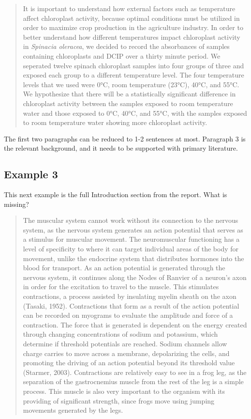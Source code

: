 \documentclass[
]{book}
\begin{document}
\begin{quote}
It is important to understand how external factors such as temperature affect chloroplast activity, because optimal conditions must be utilized in order to maximize crop production in the agriculture industry. In order to better understand how different temperatures impact chloroplast activity in \emph{Spinacia oleracea}, we decided to record the absorbances of samples containing chloroplasts and DCIP over a thirty minute period. We seperated twelve spinach chloroplast samples into four groups of three and exposed each group to a different temperature level. The four temperature levels that we used were 0°C, room temperature (23°C), 40°C, and 55°C. We hypothesize that there will be a statistically significant difference in chloroplast activity between the samples exposed to room temperature water and those exposed to 0°C, 40°C, and 55°C, with the samples exposed to room temperature water showing more chloroplast activity.
\end{quote}

The first two paragraphs can be reduced to 1-2 sentences at most. Paragraph 3 is the relevant background, and it needs to be supported with primary literature.

\hypertarget{example-3-2}{%
\subsection{Example 3}\label{example-3-2}}

This next example is the full Introduction section from the report. What is missing?

\begin{quote}
The muscular system cannot work without its connection to the nervous system, as the nervous system generates an action potential that serves as a stimulus for muscular movement. The neuromuscular functioning has a level of specificity to where it can target individual areas of the body for movement, unlike the endocrine system that distributes hormones into the blood for transport. As an action potential is generated through the nervous system, it continues along the Nodes of Ranvier of a neuron's axon in order for the excitation to travel to the muscle. This stimulates contractions, a process assisted by insulating myelin sheath on the axon (Tasaki, 1952). Contractions that form as a result of the action potential can be recorded on myograms to evaluate the amplitude and force of a contraction. The force that is generated is dependent on the energy created through changing concentrations of sodium and potassium, which determine if threshold potentials are reached. Sodium channels allow charge carries to move across a membrane, depolarizing the cells, and promoting the driving of an action potential beyond its threshold value (Starmer, 2003). Contractions are relatively easy to see in a frog leg, as the separation of the gastrocnemius muscle from the rest of the leg is a simple process. This muscle is also very important to the organism with its providing of significant strength, since frogs move using jumping movements generated by the legs.
\end{quote}
\end{document}
